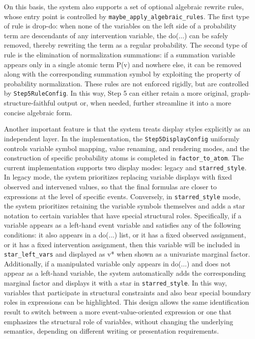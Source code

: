 \documentclass[a4paper]{report}
\begin{document}
On this basis, the system also supports a set of optional algebraic rewrite rules, whose entry point is controlled by \texttt{maybe\_apply\_algebraic\_rules}. The first type of rule is drop-do: when none of the variables on the left side of a probability term are descendants of any intervention variable, the do(...) can be safely removed, thereby rewriting the term as a regular probability. The second type of rule is the elimination of normalization summations: if a summation variable appears only in a single atomic term P(v) and nowhere else, it can be removed along with the corresponding summation symbol by exploiting the property of probability normalization. These rules are not enforced rigidly, but are controlled by \texttt{Step5RuleConfig}. In this way, Step 5 can either retain a more original, graph-structure-faithful output or, when needed, further streamline it into a more concise algebraic form.

Another important feature is that the system treats display styles explicitly as an independent layer. In the implementation, the \texttt{Step5DisplayConfig} uniformly controls variable symbol mapping, value renaming, and rendering modes, and the construction of specific probability atoms is completed in \texttt{factor\_to\_atom}. The current implementation supports two display modes: legacy and \texttt{starred\_style}. In legacy mode, the system prioritizes replacing variable displays with fixed observed and intervened values, so that the final formulas are closer to expressions at the level of specific events. Conversely, in \texttt{starred\_style} mode, the system prioritizes retaining the variable symbols themselves and adds a star notation to certain variables that have special structural roles. Specifically, if a variable appears as a left-hand event variable and satisfies any of the following conditions: it also appears in a do(...) list, or it has a fixed observed assignment, or it has a fixed intervention assignment, then this variable will be included in \texttt{star\_left\_vars} and displayed as v* when shown as a univariate marginal factor. Additionally, if a manipulated variable only appears in do(...) and does not appear as a left-hand variable, the system automatically adds the corresponding marginal factor and displays it with a star in \texttt{starred\_style}. In this way, variables that participate in structural constraints and also bear special boundary roles in expressions can be highlighted. This design allows the same identification result to switch between a more event-value-oriented expression or one that emphasizes the structural role of variables, without changing the underlying semantics, depending on different writing or presentation requirements.
\end{document}
